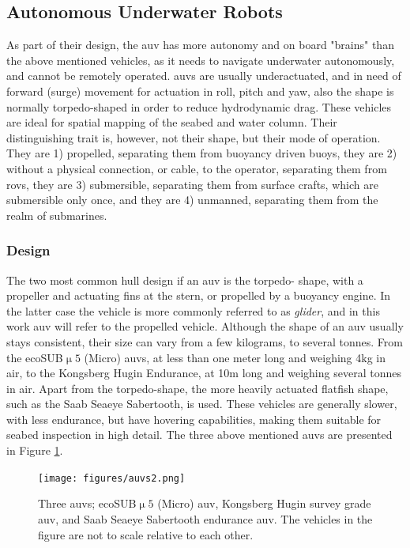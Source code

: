 \subsection{Autonomous Underwater Robots}
As part of their design, the \acrshort{auv} has more autonomy and on board "brains" than the above mentioned vehicles, as it needs to navigate underwater autonomously, and cannot be remotely operated. \acrshort{auv}s are usually underactuated, and in need of forward (surge) movement for actuation in roll, pitch and yaw, also the shape is normally torpedo-shaped in order to reduce hydrodynamic drag. These vehicles are ideal for spatial mapping of the seabed and water column. Their distinguishing trait is, however, not their shape, but their mode of operation. They are 1) propelled, separating them from buoyancy driven buoys, they are 2) without a physical connection, or cable, to the operator, separating them from \acrshort{rov}s, they are 3)  submersible, separating them from surface crafts, which are submersible only once, and they are 4) unmanned, separating them from the realm of submarines. 

\subsubsection*{Design}
The two most common hull design if an \acrshort{auv} is the torpedo- shape, with a propeller and actuating fins at the stern, or propelled by a buoyancy engine. In the latter case the vehicle is more commonly referred to as \textit{glider}, and in this work \acrshort{auv} will refer to the propelled vehicle. Although the shape of an \acrshort{auv} usually stays consistent, their size can vary from a few kilograms, to several tonnes. From the ecoSUB$\upmu5$ (Micro) \acrshort{auv}s, at less than one meter long and weighing 4kg in air, to the Kongsberg Hugin Endurance, at 10m long and weighing several tonnes in air. Apart from the torpedo-shape, the more heavily actuated flatfish shape, such as the Saab Seaeye Sabertooth, is used. These vehicles are generally slower, with less endurance, but have hovering capabilities, making them suitable for seabed inspection in high detail. The three above mentioned \acrshort{auv}s are presented in Figure \ref{fig:auvs}. 

\begin{figure}
    \centering
    \texttt{[image: figures/auvs2.png]}
    \caption{Three \acrshort{auv}s; ecoSUB$\upmu5$ (Micro) \acrshort{auv}, Kongsberg Hugin survey grade \acrshort{auv}, and Saab Seaeye Sabertooth endurance \acrshort{auv}. The vehicles in the figure are not to scale relative to each other. }
    \label{fig:auvs}
\end{figure}

